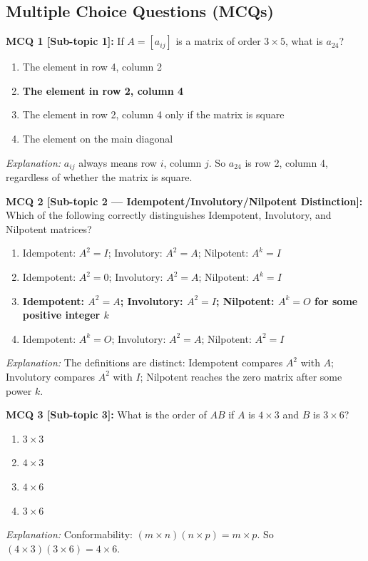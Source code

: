 \documentclass[12pt,a4paper]{article}
\begin{document}
\subsection*{Multiple Choice Questions (MCQs)}

\textbf{MCQ 1 [Sub-topic 1]:} If $A = [a_{ij}]$ is a matrix of order $3 \times 5$, what is $a_{24}$?
\begin{enumerate}[label=(\Alph*)]
  \item The element in row 4, column 2
  \item \textbf{The element in row 2, column 4}
  \item The element in row 2, column 4 only if the matrix is square
  \item The element on the main diagonal
\end{enumerate}
\textit{Explanation:} $a_{ij}$ always means row $i$, column $j$. So $a_{24}$ is row 2, column 4, regardless of whether the matrix is square.

\medskip
\textbf{MCQ 2 [Sub-topic 2 --- Idempotent/Involutory/Nilpotent Distinction]:} Which of the following correctly distinguishes Idempotent, Involutory, and Nilpotent matrices?
\begin{enumerate}[label=(\Alph*)]
  \item Idempotent: $A^2 = I$; Involutory: $A^2 = A$; Nilpotent: $A^k = I$
  \item Idempotent: $A^2 = 0$; Involutory: $A^2 = A$; Nilpotent: $A^k = I$
  \item \textbf{Idempotent: $A^2 = A$; Involutory: $A^2 = I$; Nilpotent: $A^k = O$ for some positive integer $k$}
  \item Idempotent: $A^k = O$; Involutory: $A^2 = A$; Nilpotent: $A^2 = I$
\end{enumerate}
\textit{Explanation:} The definitions are distinct: Idempotent compares $A^2$ with $A$; Involutory compares $A^2$ with $I$; Nilpotent reaches the zero matrix after some power $k$.

\medskip
\textbf{MCQ 3 [Sub-topic 3]:} What is the order of $AB$ if $A$ is $4 \times 3$ and $B$ is $3 \times 6$?
\begin{enumerate}[label=(\Alph*)]
  \item $3 \times 3$
  \item $4 \times 3$
  \item \textbf{$4 \times 6$}
  \item $3 \times 6$
\end{enumerate}
\textit{Explanation:} Conformability: $(m \times n)(n \times p) = m \times p$. So $(4 \times 3)(3 \times 6) = 4 \times 6$.
\end{document}
